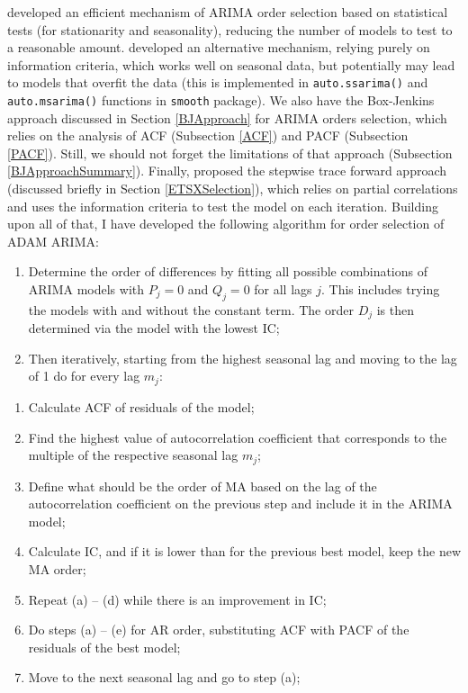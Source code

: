 \documentclass[]{book}
\providecommand{\tightlist}{%
  \setlength{\itemsep}{0pt}\setlength{\parskip}{0pt}}
\theoremstyle{definition}
\theoremstyle{definition}
\theoremstyle{definition}
\theoremstyle{definition}
\theoremstyle{remark}
\begin{document}
\citet{Hyndman2008Forecast} developed an efficient mechanism of ARIMA order selection based on statistical tests (for stationarity and seasonality), reducing the number of models to test to a reasonable amount. \citet{Svetunkov2019} developed an alternative mechanism, relying purely on information criteria, which works well on seasonal data, but potentially may lead to models that overfit the data (this is implemented in \texttt{auto.ssarima()} and \texttt{auto.msarima()} functions in \texttt{smooth} package). We also have the Box-Jenkins approach discussed in Section \ref{BJApproach} for ARIMA orders selection, which relies on the analysis of ACF (Subsection \ref{ACF}) and PACF (Subsection \ref{PACF}). Still, we should not forget the limitations of that approach (Subsection \ref{BJApproachSummary}). Finally, \citet{Sagaert2021} proposed the stepwise trace forward approach (discussed briefly in Section \ref{ETSXSelection}), which relies on partial correlations and uses the information criteria to test the model on each iteration. Building upon all of that, I have developed the following algorithm for order selection of ADAM ARIMA:

\begin{enumerate}
\def\labelenumi{\arabic{enumi}.}
\tightlist
\item
  Determine the order of differences by fitting all possible combinations of ARIMA models with \(P_j=0\) and \(Q_j=0\) for all lags \(j\). This includes trying the models with and without the constant term. The order \(D_j\) is then determined via the model with the lowest IC;
\item
  Then iteratively, starting from the highest seasonal lag and moving to the lag of 1 do for every lag \(m_j\):
\end{enumerate}

\begin{enumerate}
\def\labelenumi{\alph{enumi}.}
\tightlist
\item
  Calculate ACF of residuals of the model;
\item
  Find the highest value of autocorrelation coefficient that corresponds to the multiple of the respective seasonal lag \(m_j\);
\item
  Define what should be the order of MA based on the lag of the autocorrelation coefficient on the previous step and include it in the ARIMA model;
\item
  Calculate IC, and if it is lower than for the previous best model, keep the new MA order;
\item
  Repeat (a) -- (d) while there is an improvement in IC;
\item
  Do steps (a) -- (e) for AR order, substituting ACF with PACF of the residuals of the best model;
\item
  Move to the next seasonal lag and go to step (a);
\end{enumerate}
\end{document}
